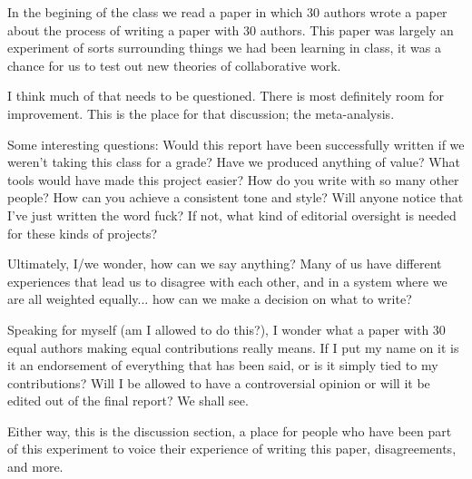 In the begining of the class we read a paper \cite{tomlinson2012} in which 30 authors wrote a paper
about the process of writing a paper with 30 authors. This paper was largely an experiment of sorts
surrounding things we had been learning in class, it was a chance for us to test out new theories 
of collaborative work.

I think much of that needs to be questioned. There is most definitely room for improvement. This
is the place for that discussion; the meta-analysis.

Some interesting questions:
Would this report have been successfully written if we weren't taking this class for a grade?
Have we produced anything of value?
What tools would have made this project easier? 
How do you write with so many other people? How can you achieve a consistent tone and style? 
Will anyone notice that I've just written the word fuck? If not, what kind of editorial oversight is needed for these kinds of projects?

Ultimately, I/we wonder, how can we say anything? Many of us have different experiences that lead us to disagree with each other, and in a system where we are all weighted equally... how can we make a decision on what to write?

Speaking for myself (am I allowed to do this?), I wonder what a paper with 30 equal authors making equal contributions really means. If I put my name on it is it an endorsement of everything that has been said, or is it simply tied to my contributions? Will I be allowed to have a controversial opinion or will it be edited out of the final report? We shall see.

Either way, this is the discussion section, a place for people who have been part of this experiment to voice their experience of writing this paper, disagreements, and more. 




